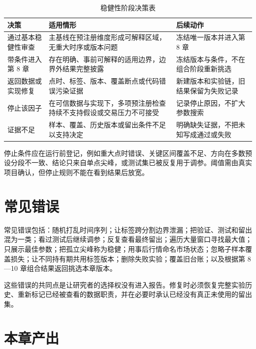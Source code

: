 \begin{table}[htbp]
  \centering
  \small
  \caption{稳健性阶段决策表}
  \label{tab:ch07-stage-decisions}
  \begin{tabularx}{\textwidth}{p{3.2cm} p{5.2cm} Y}
    \toprule
    决策 & 适用情形 & 后续动作 \\
    \midrule
    通过基本稳健性审查 & 主基线在预注册维度形成可解释区域，无重大时序或版本问题 & 冻结唯一版本并进入第 8 章 \\
    带条件进入第 8 章 & 存在明确、事前可解释的适用边界，边界外结果完整披露 & 冻结版本与条件，不在组合阶段重新挑选 \\
    返回数据或实现修复 & 点时、标签、版本、覆盖断点或代码错误污染证据 & 新建版本和实验链，旧结果保留为失败记录 \\
    停止该因子 & 在可信数据与实现下，多项预注册检查持续不支持假设或交易压力不可接受 & 记录停止原因，不扩大参数搜索 \\
    证据不足 & 样本、覆盖、历史版本或留出条件不足以支持决定 & 明确缺失证据，不把未知写成通过或失败 \\
    \bottomrule
  \end{tabularx}
\end{table}

停止条件应在运行前登记，例如重大点时错误、关键区间覆盖不足、方向在多数预设分段不一致、结论只来自单点尖峰，或测试集已被反复用于调参。阈值需由真实项目确认，但停止规则不能在看到结果后放宽。

\section{常见错误}

\begin{warningbox}
常见错误包括：随机打乱时间序列；让标签跨分割边界泄漏；把验证、测试和留出混为一类；看过测试后继续调参；反复查看最终留出；遍历大量窗口寻找最大值；只展示最佳参数；把孤立尖峰称为稳健；用事后行情命名市场状态；忽略子样本覆盖损失；让不同持有期共用标签版本；删除失败实验；覆盖旧台账；以及根据第 8—10 章组合结果返回挑选本章版本。
\end{warningbox}

这些错误的共同点是让研究者的选择权没有进入报告。修复时必须恢复完整实验历史、重新标记已经被查看的数据职责，并在必要时承认已经没有真正未使用的留出集。

\section{本章产出}

